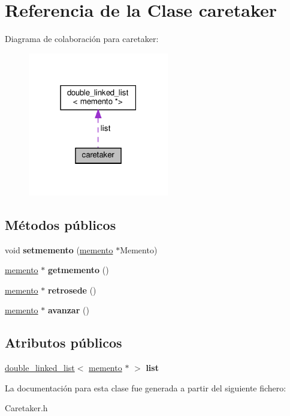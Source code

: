 \hypertarget{classcaretaker}{}\section{Referencia de la Clase caretaker}
\label{classcaretaker}


Diagrama de colaboración para caretaker\+:\nopagebreak
\begin{figure}[H]
\begin{center}
\leavevmode
\includegraphics[width=174pt]{classcaretaker__coll__graph}
\end{center}
\end{figure}
\subsection*{Métodos públicos}
\begin{DoxyCompactItemize}
\item 
\mbox{\label{classcaretaker_a0251f0e9f845fa596b9ce2f2beed3c71}} 
void {\bfseries setmemento} (\hyperlink{classmemento}{memento} $\ast$Memento)
\item 
\mbox{\label{classcaretaker_a1fb546ad9a4fb71eec138afb42b1a744}} 
\hyperlink{classmemento}{memento} $\ast$ {\bfseries getmemento} ()
\item 
\mbox{\label{classcaretaker_aa63a4f7e099ce820998d6c7c85ec8385}} 
\hyperlink{classmemento}{memento} $\ast$ {\bfseries retrosede} ()
\item 
\mbox{\label{classcaretaker_af558d2ec12cd9f95365704269ea46164}} 
\hyperlink{classmemento}{memento} $\ast$ {\bfseries avanzar} ()
\end{DoxyCompactItemize}
\subsection*{Atributos públicos}
\begin{DoxyCompactItemize}
\item 
\mbox{\label{classcaretaker_ab12d0794f90bc4ef7bdecfa11f40998c}} 
\hyperlink{classdouble__linked__list}{double\+\_\+linked\+\_\+list}$<$ \hyperlink{classmemento}{memento} $\ast$ $>$ {\bfseries list}
\end{DoxyCompactItemize}


La documentación para esta clase fue generada a partir del siguiente fichero\+:\begin{DoxyCompactItemize}
\item 
Caretaker.\+h\end{DoxyCompactItemize}
